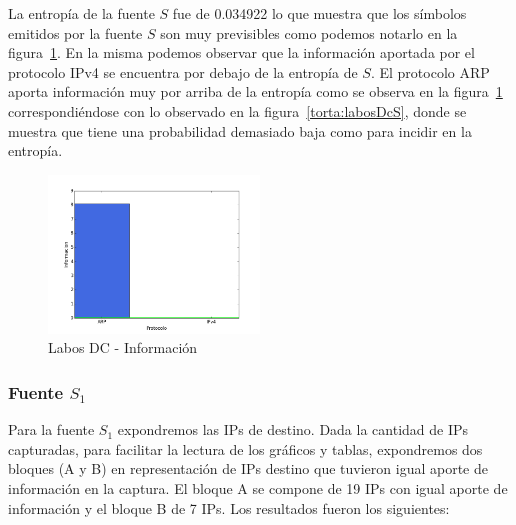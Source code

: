\documentclass[final,inline,narroweqnarray,a4paper]{ieee}
\begin{document}
La entropía de la fuente $S$ fue de 0.034922 lo que muestra que los símbolos emitidos por la fuente $S$ son muy previsibles como podemos notarlo en la figura~\ref{histo:laboDcS}. En la misma podemos observar que la información aportada por el protocolo IPv4 se encuentra por debajo de la entropía de $S$. El protocolo ARP aporta información muy por arriba de la entropía como se observa en la figura~\ref{histo:laboDcS} correspondiéndose con lo observado en la figura~\ref{torta:labosDcS}, donde se muestra que tiene una probabilidad demasiado baja como para incidir en la entropía.

\begin{figure}[H]
    \begin{center}
        \includegraphics[width=0.5\textwidth]{plot/laboDcS-bar.png}
        \caption{Labos DC - Información}
        \label{histo:laboDcS}
    \end{center}
\end{figure}

\subsubsection{Fuente $S_1$}

Para la fuente $S_1$ expondremos las IPs de destino. Dada la cantidad de IPs capturadas, para facilitar la lectura de los gráficos y tablas, expondremos dos bloques (A y B) en representación de IPs destino que tuvieron igual aporte de información en la captura. El bloque A se compone de 19 IPs con igual aporte de información y el bloque B de 7 IPs. Los resultados fueron los siguientes:
\end{document}
